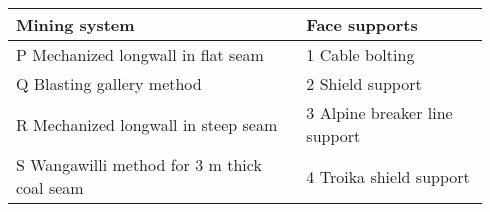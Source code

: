 \begin{center}
\renewcommand{\arraystretch}{1.25}
\setlength{\tabcolsep}{4pt} %
\small
\begin{tabular}{ |p{0.58\linewidth}|p{0.36\linewidth}| }
  \hline
  \textbf{Mining system} & \textbf{Face supports} \\ \hline
  {\raggedright P\; Mechanized longwall in flat seam\par} &
  {\raggedright 1\; Cable bolting\par} \\ \hline
  {\raggedright Q\; Blasting gallery method\par} &
  {\raggedright 2\; Shield support\par} \\ \hline
  {\raggedright R\; Mechanized longwall in steep seam\par} &
  {\raggedright 3\; Alpine breaker line support\par} \\ \hline
  {\raggedright S\; Wangawilli method for 3 m thick coal seam\par} &
  {\raggedright 4\; Troika shield support\par} \\ \hline
\end{tabular}
\normalsize
\end{center}
